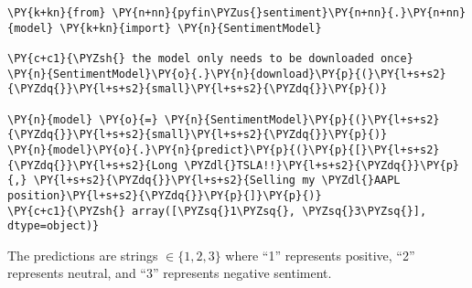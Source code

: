 \begin{Verbatim}[commandchars=\\\{\}]
\PY{k+kn}{from} \PY{n+nn}{pyfin\PYZus{}sentiment}\PY{n+nn}{.}\PY{n+nn}{model} \PY{k+kn}{import} \PY{n}{SentimentModel}

\PY{c+c1}{\PYZsh{} the model only needs to be downloaded once}
\PY{n}{SentimentModel}\PY{o}{.}\PY{n}{download}\PY{p}{(}\PY{l+s+s2}{\PYZdq{}}\PY{l+s+s2}{small}\PY{l+s+s2}{\PYZdq{}}\PY{p}{)}

\PY{n}{model} \PY{o}{=} \PY{n}{SentimentModel}\PY{p}{(}\PY{l+s+s2}{\PYZdq{}}\PY{l+s+s2}{small}\PY{l+s+s2}{\PYZdq{}}\PY{p}{)}
\PY{n}{model}\PY{o}{.}\PY{n}{predict}\PY{p}{(}\PY{p}{[}\PY{l+s+s2}{\PYZdq{}}\PY{l+s+s2}{Long \PYZdl{}TSLA!!}\PY{l+s+s2}{\PYZdq{}}\PY{p}{,} \PY{l+s+s2}{\PYZdq{}}\PY{l+s+s2}{Selling my \PYZdl{}AAPL position}\PY{l+s+s2}{\PYZdq{}}\PY{p}{]}\PY{p}{)}
\PY{c+c1}{\PYZsh{} array([\PYZsq{}1\PYZsq{}, \PYZsq{}3\PYZsq{}], dtype=object)}
\end{Verbatim}

The predictions are strings $\in \{1, 2, 3\}$ where ``1'' represents positive, ``2'' represents neutral, and ``3'' represents negative sentiment.



